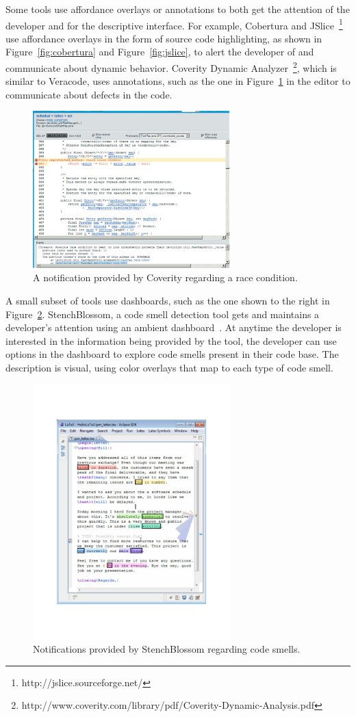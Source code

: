\documentclass{llncs}
\begin{document}
Some tools use affordance overlays or annotations to both get the attention of the developer and for the descriptive interface. For example, Cobertura and JSlice~\footnote{http://jslice.sourceforge.net/} use affordance overlays in the form of source code highlighting, as shown in Figure~\ref{fig:cobertura} and Figure~\ref{fig:jslice}, to alert the developer of and communicate about dynamic behavior. Coverity Dynamic Analyzer~\footnote{http://www.coverity.com/library/pdf/Coverity-Dynamic-Analysis.pdf}, which is similar to Veracode, uses annotations, such as the one in Figure~\ref{fig:coverity} in the editor to communicate about defects in the code.

\begin{figure}
	\centering
	\includegraphics[width=3in]{figs/coverity-dynamic.png}
	\caption{A notification provided by Coverity regarding a race condition.}
	\label{fig:coverity}
\end{figure}

A small subset of tools use dashboards, such as the one shown to the right in Figure~\ref{fig:stench}. StenchBlossom, a code smell detection tool gets and maintains a developer's attention using an ambient dashboard~\cite{Murphy-Hill:2010:Ambient}. At anytime the developer is interested in the information being provided by the tool, the developer can use options in the dashboard to explore code smells present in their code base. The description is visual, using color overlays that map to each type of code smell. 

\begin{figure}
	\centering
	\includegraphics[width=3in]{figs/stenchblossom.pdf}
	\caption{Notifications provided by StenchBlossom regarding code smells.}
	\label{fig:stench}
\end{figure}
\end{document}
